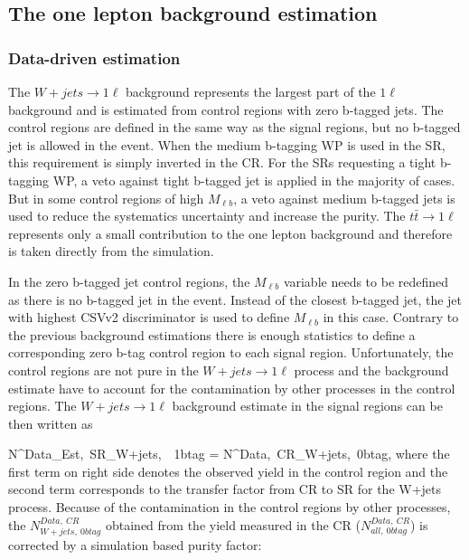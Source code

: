 \subsection{The one lepton background estimation}

\subsubsection{Data-driven estimation}

The $W+jets \to 1\ell$ background  represents the largest part of the $1\ell$ background and is estimated from control regions with zero b-tagged jets. The control regions are defined in the same way as the signal regions, but no b-tagged jet is allowed in the event. When the medium b-tagging WP is used in the SR, this requirement is simply inverted in the CR. For the SRs requesting a tight b-tagging WP, a veto against tight b-tagged jet is applied in the majority of cases.  But in some control regions of high $M_{\ell b}$, a veto against medium b-tagged jets is used to reduce the systematics uncertainty and increase the purity. The  $t\bar{t} \to 1\ell$ represents only a small contribution to the one lepton background and therefore is taken directly from the simulation.

In the zero b-tagged jet control regions, the $M_{\ell b}$ variable needs to be redefined as there is no b-tagged jet in the event. Instead of the closest b-tagged jet, the jet with highest CSVv2 discriminator is used to define $M_{\ell b}$ in this case. Contrary to the previous background estimations there is enough statistics to define a corresponding zero b-tag control region to each signal region. Unfortunately, the control regions are not pure in the $W+jets \to 1\ell$  process and the background estimate have to account for the contamination by other  processes in the control regions. The $W+jets \to 1\ell$  background estimate in the signal regions can be then written as

{
N^{Data_{Est},~SR}_{W+jets,~\geq~1btag}  =  N^{Data,~CR}_{W+jets,~0btag}\times  {},
}
where the first term on right side denotes the observed yield in the control region and the second term corresponds to the transfer factor from CR to SR for the W+jets process. Because of the contamination in the control regions by other processes, the $N^{Data,~CR}_{W+jets,~0btag}$ obtained from the yield measured in the CR ($N^{Data,~CR}_{all,~0btag}$) is corrected by a simulation based purity factor: 


